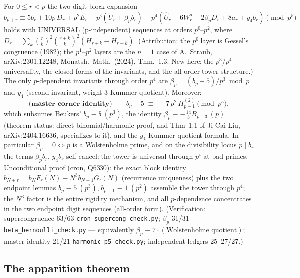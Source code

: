 \begin{theorem}[tower]\label{thm:tower}
For $0\le r<p$ the two-digit block expansion
\[
b_{p+r}\equiv 5b_r+10p\,D_r+p^2E_r+p^3(\tilde U_r+\beta_p b_r)
+p^4(\hat U_r-6W^a_r+2\beta_pD_r+8a_r+y_4b_r)\pmod{p^5}
\]
holds with UNIVERSAL (p-independent) sequences at orders $p^0$–$p^2$, where
$D_r=\sum_k\binom rk^2\binom{r+k}k^2(H_{r+k}-H_{r-k})$.  (Attribution: the
$p^0$ layer is Gessel's congruence (1982); the $p^1$--$p^2$ layers are the
$n=1$ case of A.~Straub, arXiv:2301.12248, Monatsh.\ Math.\ (2024),
Thm.~1.3.  New here: the $p^3$/$p^4$ universality, the closed forms of the
invariants, and the all-order tower structure.)  The only
$p$-dependent invariants through order $p^4$ are $\beta_p=(b_p-5)/p^3\bmod p$
and $y_4$ (second invariant, weight-3 Kummer quotient).  Moreover:
\[
\textbf{(master corner identity)}\qquad
b_p-5\;\equiv\;-7\,p^2\,H^{(2)}_{p-1}\pmod{p^5},
\]
which subsumes Beukers' $b_p\equiv5\ (p^3)$, the identity
$\beta_p\equiv-\tfrac{14}3B_{p-3}\ (p)$ (theorem status: direct
binomial/harmonic proof, and Thm~1.1 of Ji-Cai Liu, arXiv:2404.16636,
specializes to it), and the $y_4$ Kummer-quotient formula.  In particular
$\beta_p=0\iff p$ is a Wolstenholme prime, and on the divisibility locus
$p\mid b_r$ the terms $\beta_pb_r$, $y_4b_r$ self-cancel: the tower is
universal through $p^4$ at bad primes.
Unconditional proof (cron, Q6330): the exact block identity
$b_{N+r}=b_N F_r(N)-N^3b_{N-1}G_r(N)$ (recurrence uniqueness) plus the two
endpoint lemmas $b_p\equiv5\ (p^3)$, $b_{p-1}\equiv1\ (p^2)$ assemble the
tower through $p^4$; the $N^3$ factor is the entire rigidity mechanism, and
all $p$-dependence concentrates in the two endpoint digit sequences
(all-order form).  (Verification: supercongruence 63/63
\texttt{cron\_supercong\_check.py}; $\beta_p$ 31/31
\texttt{beta\_bernoulli\_check.py} — equivalently $\beta_p\equiv
7\cdot(\text{Wolstenholme quotient})$; master identity 21/21
\texttt{harmonic\_p5\_check.py}; independent ledgers 25--27/27.)
\end{theorem}

\subsection{The apparition theorem}

